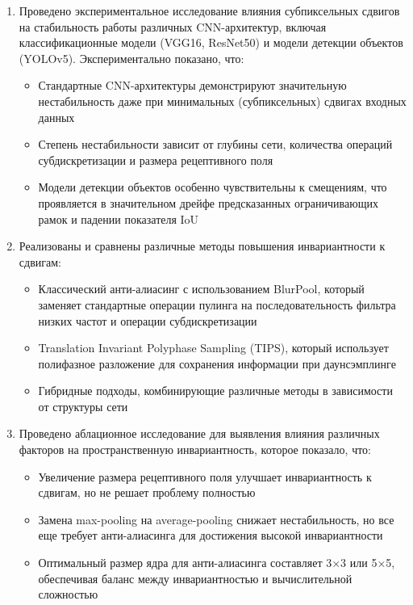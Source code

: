 \begin{enumerate}
    \item Проведено экспериментальное исследование влияния субпиксельных сдвигов на стабильность работы различных CNN-архитектур, включая классификационные модели (VGG16, ResNet50) и модели детекции объектов (YOLOv5). Экспериментально показано, что:
    \begin{itemize}
        \item Стандартные CNN-архитектуры демонстрируют значительную нестабильность даже при минимальных (субпиксельных) сдвигах входных данных
        \item Степень нестабильности зависит от глубины сети, количества операций субдискретизации и размера рецептивного поля
        \item Модели детекции объектов особенно чувствительны к смещениям, что проявляется в значительном дрейфе предсказанных ограничивающих рамок и падении показателя IoU
    \end{itemize}
    
    \item Реализованы и сравнены различные методы повышения инвариантности к сдвигам:
    \begin{itemize}
        \item Классический анти-алиасинг с использованием BlurPool, который заменяет стандартные операции пулинга на последовательность фильтра низких частот и операции субдискретизации
        \item Translation Invariant Polyphase Sampling (TIPS), который использует полифазное разложение для сохранения информации при даунсэмплинге
        \item Гибридные подходы, комбинирующие различные методы в зависимости от структуры сети
    \end{itemize}
    
    \item Проведено аблационное исследование для выявления влияния различных факторов на пространственную инвариантность, которое показало, что:
    \begin{itemize}
        \item Увеличение размера рецептивного поля улучшает инвариантность к сдвигам, но не решает проблему полностью
        \item Замена max-pooling на average-pooling снижает нестабильность, но все еще требует анти-алиасинга для достижения высокой инвариантности
        \item Оптимальный размер ядра для анти-алиасинга составляет 3×3 или 5×5, обеспечивая баланс между инвариантностью и вычислительной сложностью
    \end{itemize}
\end{enumerate}

